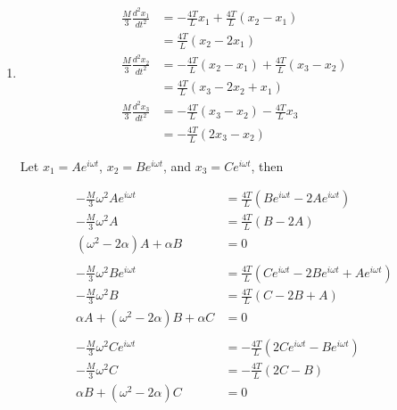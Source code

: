 \documentclass{article}
\begin{document}
\begin{enumerate}
  \item

        \begin{align*}
          \frac{M}{3} \frac{d^2 x_1}{d t^2} & = -\frac{4 T}{L} x_1 + \frac{4 T}{L} (x_2 - x_1)         \\
                                            & = \frac{4 T}{L} (x_2 - 2 x_1)                            \\
          \frac{M}{3} \frac{d^2 x_2}{d t^2} & = -\frac{4 T}{L} (x_2 - x_1) + \frac{4 T}{L} (x_3 - x_2) \\
                                            & = \frac{4 T}{L} (x_3 - 2 x_2 + x_1)                      \\
          \frac{M}{3} \frac{d^2 x_3}{d t^2} & = -\frac{4 T}{L} (x_3 - x_2) - \frac{4 T}{L} x_3         \\
                                            & = -\frac{4 T}{L} (2 x_3 - x_2)
        \end{align*}

        Let $x_1 = A e^{i \omega t}$, $x_2 = B e^{i \omega t}$, and $x_3 = C e^{i \omega t}$, then

        \begin{align*}
          -\frac{M}{3} \omega^2 A e^{i \omega t}        & = \frac{4 T}{L} (B e^{i \omega t} - 2 A e^{i \omega t})                    \\
          -\frac{M}{3} \omega^2 A                       & = \frac{4 T}{L} (B - 2 A)                                                  \\
          (\omega^2 - 2 \alpha) A + \alpha B            & = 0                                                                        \\ \\
          -\frac{M}{3} \omega^2 B e^{i \omega t}        & = \frac{4 T}{L} (C e^{i \omega t} - 2 B e^{i \omega t} + A e^{i \omega t}) \\
          -\frac{M}{3} \omega^2 B                       & = \frac{4 T}{L} (C - 2 B + A)                                              \\
          \alpha A + (\omega^2 - 2 \alpha) B + \alpha C & = 0                                                                        \\ \\
          -\frac{M}{3} \omega^2 C e^{i \omega t}        & = -\frac{4 T}{L} (2 C e^{i \omega t} - B e^{i \omega t})                   \\
          -\frac{M}{3} \omega^2 C                       & = -\frac{4 T}{L} (2 C - B)                                                 \\
          \alpha B + (\omega^2 - 2 \alpha) C            & = 0
        \end{align*}


\end{enumerate}
\end{document}

